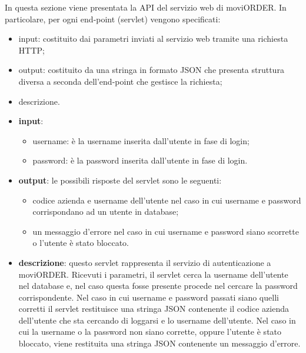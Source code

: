 In questa sezione viene presentata la API del servizio web di moviORDER. In particolare, per ogni end-point (servlet) vengono specificati:
\begin{itemize}
	\item input: costituito dai parametri inviati al servizio web tramite una richiesta HTTP;
	\item output: costituito da una stringa in formato JSON che presenta struttura diversa a seconda dell'end-point che gestisce la richiesta;
	\item descrizione.
\end{itemize}


\begin{itemize}
	\item \textbf{input}:
		\begin{itemize}
			\item username: è la username inserita dall'utente in fase di login;
			\item password: è la password inserita dall'utente in fase di login.
		\end{itemize}
	\item \textbf{output}: le possibili risposte del servlet sono le seguenti:
		\begin{itemize}
			\item codice azienda e username dell'utente nel caso in cui username e password corrispondano ad un utente in database;
			\item un messaggio d'errore nel caso in cui username e password siano scorrette o l'utente è stato bloccato. 
		\end{itemize}
		\item \textbf{descrizione}: questo servlet rappresenta il servizio di autenticazione a moviORDER. Ricevuti i parametri, il servlet cerca la username dell'utente nel database e, nel caso questa fosse presente procede nel cercare la password corrispondente. Nel caso in cui username e password passati siano quelli corretti il servlet restituisce una stringa JSON contenente il codice azienda dell'utente che sta cercando di loggarsi e lo username dell'utente. Nel caso in cui la username o la password non siano corrette, oppure l'utente è stato bloccato, viene restituita una stringa JSON contenente un messaggio d'errore.
\end{itemize}



